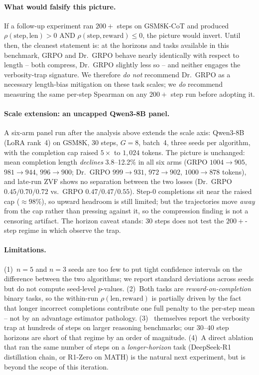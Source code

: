 \paragraph{What would falsify this picture.}
If a follow-up experiment ran $200{+}$ steps on GSM8K-CoT and
produced $\rho(\text{step},\text{len})>0$ AND
$\rho(\text{step},\text{reward})\le 0$, the picture would invert.
Until then, the cleanest statement is: at the horizons and tasks
available in this benchmark, GRPO and Dr.~GRPO behave nearly
identically with respect to length -- both compress, Dr.~GRPO
slightly less so -- and neither engages the verbosity-trap
signature. We therefore \emph{do not} recommend Dr.~GRPO as a
necessary length-bias mitigation on these task scales; we
\emph{do} recommend measuring the same per-step Spearman on any
$200{+}$ step run before adopting it.

\paragraph{Scale extension: an uncapped Qwen3-8B panel.}
A six-arm panel run after the analysis above extends the scale axis:
Qwen3-8B (LoRA rank~4) on GSM8K, $30$ steps, $G{=}8$, batch~4, three
seeds per algorithm, with the completion cap raised $5\times$ to
$1{,}024$ tokens. The picture is unchanged: mean completion length
\emph{declines} 3.8--12.2\% in all six arms (GRPO $1004{\to}905$,
$981{\to}944$, $996{\to}900$; Dr.~GRPO $999{\to}931$, $972{\to}902$,
$1000{\to}878$ tokens), and late-run ZVF shows no separation between the
two losses (Dr.~GRPO $0.45/0.70/0.72$ vs.\ GRPO $0.47/0.47/0.55$).
Step-0 completions sit near the raised cap ($\approx 98\%$), so upward
headroom is still limited; but the trajectories move \emph{away} from
the cap rather than pressing against it, so the compression finding is
not a censoring artifact. The horizon caveat stands: $30$ steps does not
test the $200{+}$-step regime in which \cite{tong2025drgrpo} observe the
trap.

\paragraph{Limitations.}
(1)~$n{=}5$ and $n{=}3$ seeds are too few to put tight confidence
intervals on the difference between the two algorithms; we report
standard deviations across seeds but do not compute seed-level
$p$-values. (2)~Both tasks are \emph{reward-on-completion}
binary tasks, so the within-run $\rho(\text{len},\text{reward})$
is partially driven by the fact that longer incorrect completions
contribute one full penalty to the per-step mean -- not by an
advantage estimator pathology. (3)~\cite{tong2025drgrpo} themselves
report the verbosity trap at hundreds of steps on larger
reasoning benchmarks; our $30$--$40$ step horizons are short of
that regime by an order of magnitude. (4)~A direct ablation that
ran the same number of steps on a \emph{longer-horizon} task
(DeepSeek-R1 distillation chain, or R1-Zero on MATH) is the
natural next experiment, but is beyond the scope of this
iteration.

